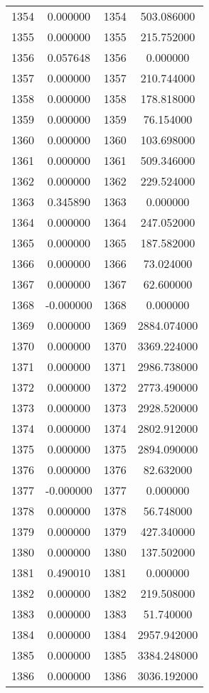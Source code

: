 \documentclass[12pt]{article}
\begin{document}
\begin{longtable}{@{}cccc@{}}
1354 & 0.000000 & 1354 & 503.086000 \\
1355 & 0.000000 & 1355 & 215.752000 \\
1356 & 0.057648 & 1356 & 0.000000 \\
1357 & 0.000000 & 1357 & 210.744000 \\
1358 & 0.000000 & 1358 & 178.818000 \\
1359 & 0.000000 & 1359 & 76.154000 \\
1360 & 0.000000 & 1360 & 103.698000 \\
1361 & 0.000000 & 1361 & 509.346000 \\
1362 & 0.000000 & 1362 & 229.524000 \\
1363 & 0.345890 & 1363 & 0.000000 \\
1364 & 0.000000 & 1364 & 247.052000 \\
1365 & 0.000000 & 1365 & 187.582000 \\
1366 & 0.000000 & 1366 & 73.024000 \\
1367 & 0.000000 & 1367 & 62.600000 \\
1368 & -0.000000 & 1368 & 0.000000 \\
1369 & 0.000000 & 1369 & 2884.074000 \\
1370 & 0.000000 & 1370 & 3369.224000 \\
1371 & 0.000000 & 1371 & 2986.738000 \\
1372 & 0.000000 & 1372 & 2773.490000 \\
1373 & 0.000000 & 1373 & 2928.520000 \\
1374 & 0.000000 & 1374 & 2802.912000 \\
1375 & 0.000000 & 1375 & 2894.090000 \\
1376 & 0.000000 & 1376 & 82.632000 \\
1377 & -0.000000 & 1377 & 0.000000 \\
1378 & 0.000000 & 1378 & 56.748000 \\
1379 & 0.000000 & 1379 & 427.340000 \\
1380 & 0.000000 & 1380 & 137.502000 \\
1381 & 0.490010 & 1381 & 0.000000 \\
1382 & 0.000000 & 1382 & 219.508000 \\
1383 & 0.000000 & 1383 & 51.740000 \\
1384 & 0.000000 & 1384 & 2957.942000 \\
1385 & 0.000000 & 1385 & 3384.248000 \\
1386 & 0.000000 & 1386 & 3036.192000 \\

\end{longtable}
\end{document}
